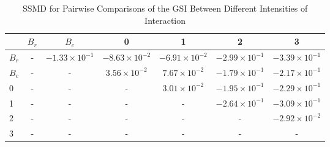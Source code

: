 \begin{table*}[!t]
\caption{SSMD for Pairwise Comparisons of the GSI Between Different Intensities of Interaction\label{tab:ssmd_gsi}}
\centering
\begin{tabular}{lcccccc}
\toprule
 & $B_r$ & $B_c$ & 0 & 1 & 2 & 3 \\
\midrule
$B_r$ & - & $-1.33 \times 10^{-1}$ & $-8.63 \times 10^{-2}$ & $-6.91 \times 10^{-2}$ & $-2.99 \times 10^{-1}$ & $-3.39 \times 10^{-1}$ \\
$B_c$ & - & - & $3.56 \times 10^{-2}$ & $7.67 \times 10^{-2}$ & $-1.79 \times 10^{-1}$ & $-2.17 \times 10^{-1}$ \\
0 & - & - & - & $3.01 \times 10^{-2}$ & $-1.95 \times 10^{-1}$ & $-2.29 \times 10^{-1}$ \\
1 & - & - & - & - & $-2.64 \times 10^{-1}$ & $-3.09 \times 10^{-1}$ \\
2 & - & - & - & - & - & $-2.92 \times 10^{-2}$ \\
3 & - & - & - & - & - & - \\
\bottomrule
\end{tabular}
\end{table*}
